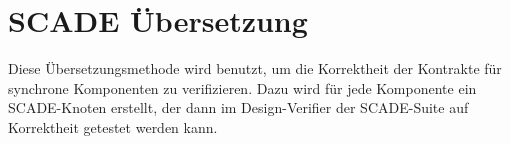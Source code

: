 \section{SCADE Übersetzung}
Diese Übersetzungsmethode wird benutzt, um die Korrektheit der Kontrakte für synchrone Komponenten zu verifizieren.
Dazu wird für jede Komponente ein SCADE-Knoten erstellt, der dann im Design-Verifier der SCADE-Suite auf Korrektheit getestet werden kann.
